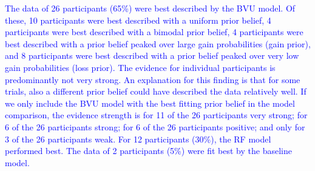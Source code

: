 \documentclass[a4paper, man, natbib, floatsintext]{apa6} %
\begin{document}
\textcolor{blue}{The data of 26 participants (65\%) were best described by the BVU model. Of these, 10 participants were best described with a uniform prior belief, 4 participants were best described with a bimodal prior belief, 4 participants were best described with a prior belief peaked over large gain probabilities (gain prior), and 8 participants were best described with a prior belief peaked over very low gain probabilities (loss prior). The evidence for individual participants is predominantly not very strong. An explanation for this finding is that for some trials, also a different prior belief could have described the data relatively well. If we only include the BVU model with the best fitting prior belief in the model comparison, the evidence strength is for 11 of the 26 participants very strong; for 6 of the 26 participants strong; for 6 of the 26 participants positive; and only for 3 of the 26 participants weak. For 12 participants (30\%), the RF model performed best. The data of 2 participants (5\%) were fit best by the baseline model.} 
\end{document}
